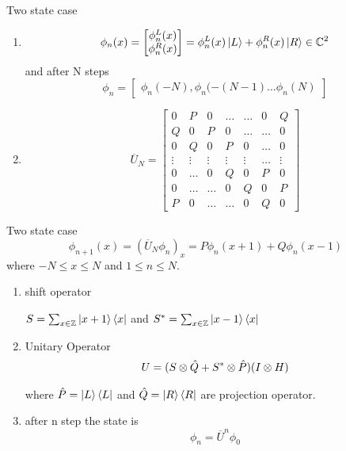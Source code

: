 \documentclass[xcolor=svgnames]{beamer}
\def\leq{\leqslant}
\newcommand{\tens}[1]{
  \mathbin{\mathop{\otimes}\limits_{#1}}}
\begin{document}
\begin{frame}{Two state case}
\begin{enumerate}
    \item $$\phi_n(x) = \begin{bmatrix}
                \phi_{n}^L(x)\\
                \phi_{n}^R(x)
\end{bmatrix}   = \phi_{n}^L(x)\ket{L} + \phi_{n}^R(x)\ket{R} \in \mathbb{C}^2$$
and after N steps  $$ \phi_n = \begin{bmatrix}
        \phi_n(-N),\phi_n(-(N-1) \hdots \phi_n(N)
\end{bmatrix}$$
\item $$ \overline{U}_N = \begin{bmatrix}
                0 & P & 0 & \hdots & \hdots & 0 & Q\\
                Q & 0 & P & 0 & \hdots & \hdots & 0\\
                0 & Q & 0 & P & 0 & \hdots & 0\\
                \vdots & \vdots & \vdots & \vdots & \vdots & \hdots & \vdots\\
                0 & \hdots & 0 & Q & 0 & P & 0\\
                0 & \hdots & \hdots & 0 & Q & 0 & P\\
                P & 0 & \hdots & \hdots & 0 & Q & 0
\end{bmatrix}$$
\end{enumerate}
\end{frame}

\begin{frame}{Two state case}
$$  \phi_{n+1}(x) = (\overline{U}_N\phi_n)_x = P\phi_n(x+1) + Q\phi_n(x-1)$$
where $-N \leq x \leq N$ and $1 \leq n \leq N.$\\
\begin{enumerate}
    \item shift operator \begin{center}
    $S = \sum_{x \in \mathbb{Z}} \ket{x+1}\bra{x}$ and 
    $S^* = \sum_{x \in \mathbb{Z}} \ket{x-1}\bra{x}$
\end{center}
\item Unitary Operator $$  U = ( S \tens{} \Hat{Q} + S^* \tens{} \Hat{P})(I \tens{} H)$$
where $\Hat{P} = \ket{L}\bra{L}$ and $\Hat{Q}= \ket{R}\bra{R}$ are projection operator.
\item after n step the state is 
$$\phi_n = \overline{U}^n\phi_0$$
\end{enumerate}
\end{frame}
\end{document}

